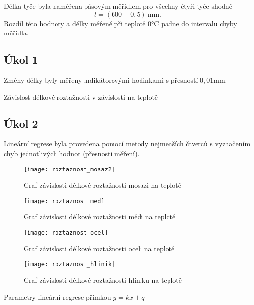 \documentclass[protokol.tex]{subfiles}
\begin{document}
Délka tyče byla naměřena pásovým měřidlem pro všechny čtyři tyče shodně
$$ l = (600 \pm 0,5) \ \si{\milli\metre}. $$
Rozdíl této hodnoty a délky měřené při teplotě $0 \si{\celsius}$ padne do intervalu chyby měřidla.

\subsection*{Úkol 1}
Změny délky byly měřeny indikátorovými hodinkami s přesností $0,01 \si{\milli\metre}$. 

\begin{table}[H] 
\centering
\setlength{\tabcolsep}{20pt}

\caption{Závislost délkové roztažnosti v závislosti na teplotě}
\label{tab:roztaznost}
\end{table}

\subsection*{Úkol 2}
Lineární regrese byla provedena pomocí metody nejmenších čtverců s vyznačením chyb jednotlivých hodnot (přesnosti měření).

\begin{figure}[H]
\centering
\texttt{[image: roztaznost\_mosaz2]}
\caption{Graf závislosti délkové roztažnosti mosazi na teplotě}
\end{figure}

\begin{figure}[H]
\centering
\texttt{[image: roztaznost\_med]}
\caption{Graf závislosti délkové roztažnosti mědi na teplotě}
\end{figure}

\begin{figure}[H]
\centering
\texttt{[image: roztaznost\_ocel]}
\caption{Graf závislosti délkové roztažnosti oceli na teplotě}
\end{figure}

\begin{figure}[H]
\centering
\texttt{[image: roztaznost\_hlinik]}
\caption{Graf závislosti délkové roztažnosti hliníku na teplotě}
\end{figure}

\begin{table}[H] 
\centering
\setlength{\tabcolsep}{10pt}

\caption{Parametry lineární regrese přímkou $y = kx + q$}
\label{tab:parametry}
\end{table}
\end{document}
